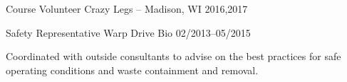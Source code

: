 

\begin{cventries}
    
  \cventry
    {Course Volunteer} %
    {Crazy Legs -- Madison, WI} %
    {} %
    {2016,2017} %
    {
    }

  \cventry
    {Safety Representative} %
    {Warp Drive Bio} %
    {} %
    {02/2013--05/2015} %
    {
      \begin{cvitems} %
        \item {Coordinated with outside consultants to advise on the best practices for safe operating conditions and waste containment and removal.}
      \end{cvitems}
    }


    

\end{cventries}